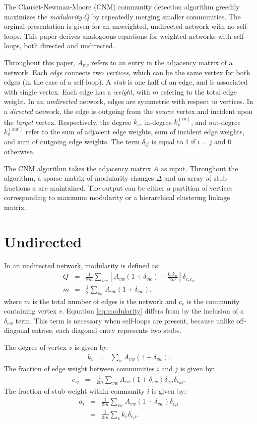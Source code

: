 \documentclass{article}
\newcommand{\beq}{\begin{eqnarray}}
\newcommand{\eeq}{\end{eqnarray}}
\begin{document}
The Clauset-Newman-Moore (CNM) community detection algorithm \cite{clauset_finding_2004}
greedily maximizes the {\em modularity} $Q$ by repeatedly merging smaller communities.
The orginal presentation is given for an unweighted, undirected network with no self-loops.
This paper derives analogoous equations for weighted networks with self-loops,
both directed and undirected.

Throughout this paper, $A_{vw}$ refers to an entry in the adjacency matrix of a network.
Each {\em edge} connects two {\em vertices},
which can be the same vertex for both edges (in the case of a self-loop).
A {\em stub} is one half of an edge, and is associated with single vertex.
Each edge has a {\em weight}, with $m$ refering to the total edge weight.
In an {\em undirected} network, edges are symmetric with respect to vertices.
In a {\em directed} network, the edge is outgoing from the {\em source} vertex
and incident upon the {\em target} vertex.
Respectively, the degree $k_v$, in-degree $k_v^{(in)}$, and out-degree $k_v^{(out)}$ refer to the
sum of adjacent edge weights, sum of incident edge weights, and sum of outgoing edge weights.
The term $\delta_{ij}$ is equal to 1 if $i = j$ and 0 otherwise.

The CNM algorithm takes the adjacency matrix $A$ as input. Throughout the algorithm,
a sparse matrix of modularity changes $\Delta$ and an array of stub fractions $a$
are maintained. The output can be either a partition of vertices corresponding to
maximum modularity or a hierarchical clustering linkage matrix.

\section{Undirected}
In an undirected network, modularity is defined as:
\beq
\label{eq:modularity} Q &=& \frac{1}{2m} \sum_{vw} \left[ A_{vw} (1 + \delta_{vw}) - \frac{k_v k_w}{2m} \right]\delta_{c_v c_w} \\
m &=& \frac{1}{2} \sum_{vw} A_{vw} (1 + \delta_{vw}),
\eeq
where $m$ is the total number of edges is the network and $c_v$ is the community containing vertex $v$.
Equation \ref{eq:modularity} differs from \cite{clauset_finding_2004} by the inclusion of a $\delta_{vw}$ term.
This term is necessary when self-loops are present,
because unlike off-diagonal entries, each diagonal entry represents two stubs.

The degree of vertex $v$ is given by:
\beq
k_v &=& \sum_w A_{vw} (1+\delta_{vw}).
\eeq
The fraction of edge weight between communities $i$ and $j$ is given by:
\beq
e_{ij} &=& \frac{1}{2m}\sum_{vw} A_{vw} (1+\delta_{vw}) \delta_{c_vi}\delta_{c_wj}.
\eeq
The fraction of stub weight within community $i$ is given by:
\beq
a_i &=& \frac{1}{2m}\sum_{vw}A_{vw} (1 + \delta_{vw}) \delta_{c_vi} \\
&=& \frac{1}{2m}\sum_v k_v \delta_{c_vi}.
\eeq
\end{document}
